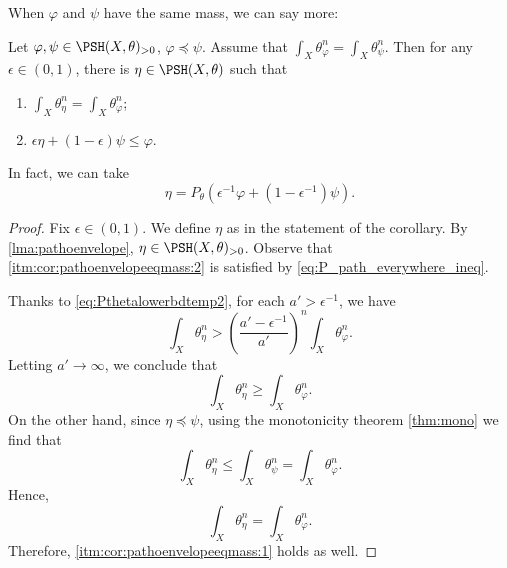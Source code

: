When $\varphi$ and $\psi$ have the same mass, we can say more:
\begin{corollary}\label{cor:pathoenvelopeeqmass}
    Let $\varphi,\psi\in \PSH(X,\theta)_{>0}$, $\varphi\preceq \psi$. Assume that $\int_X \theta_{\varphi}^n=\int_X \theta_{\psi}^n$. Then for any $\epsilon\in (0,1)$, there is $\eta\in \PSH(X,\theta)$ such that
    \begin{enumerate}
        \item\label{itm:cor:pathoenvelopeeqmass:1} $\int_X \theta_{\eta}^n=\int_X \theta_{\varphi}^n$;
        \item\label{itm:cor:pathoenvelopeeqmass:2} $\epsilon\eta+(1-\epsilon)\psi\leq \varphi$.
    \end{enumerate}
    In fact, we can take
    \[
        \eta=P_{\theta}\left(\epsilon^{-1}\varphi+(1-\epsilon^{-1})\psi\right).
    \]
\end{corollary}

\begin{proof}
    Fix $\epsilon \in (0,1)$. We define $\eta$ as in the statement of the corollary. By \cref{lma:pathoenvelope}, $\eta\in \PSH(X,\theta)_{>0}$. Observe that \ref{itm:cor:pathoenvelopeeqmass:2} is satisfied by \eqref{eq:P_path_everywhere_ineq}.

    Thanks to \eqref{eq:Pthetalowerbdtemp2}, for each $a'>\epsilon^{-1}$, we have
    \[
    \int_X \theta_{\eta}^n>\left(\frac{a'-\epsilon^{-1}}{a'}\right)^n\int_X \theta_{\varphi}^n.
    \]
    Letting $a'\to\infty$, we conclude that
    \[
    \int_X \theta_{\eta}^n\geq \int_X \theta_{\varphi}^n.
    \]
    On the other hand, since $\eta\preceq \psi$, using the monotonicity theorem \cref{thm:mono} we find that
    \[
    \int_X \theta_{\eta}^n\leq \int_X \theta_{\psi}^n= \int_X \theta_{\varphi}^n.
    \]
    Hence,
    \[
    \int_X \theta_{\eta}^n= \int_X \theta_{\varphi}^n.
    \]
    Therefore, \ref{itm:cor:pathoenvelopeeqmass:1} holds as well.
\end{proof}



